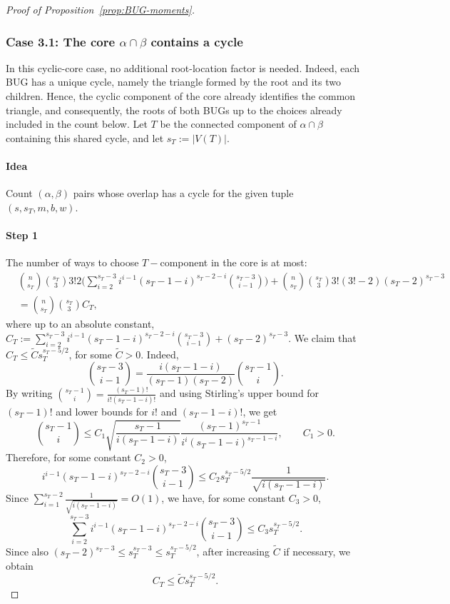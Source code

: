 \documentclass[11pt, letterpaper]{article}
\numberwithin{equation}{section}
\begin{document}
\begin{proof}[Proof of Proposition~\ref{prop:BUG-moments}]
\subsubsection*{Case 3.1: The core $\alpha \cap \beta$ contains a cycle} In this cyclic-core case, no additional root-location factor is needed. Indeed, each BUG has a unique cycle, namely the triangle formed by the root and its two
children. Hence, the cyclic component of the core already identifies the common triangle, and consequently, the roots of both BUGs up to the choices already included in the count below. Let $T$ be the connected component of $\alpha\cap\beta$ containing this shared cycle, and let $s_T:=|V(T)|.$

\paragraph*{Idea} Count $(\alpha,\beta)$ pairs whose overlap has a cycle for the given tuple $(s,s_T,m,b,w)$.

\paragraph*{Step 1}  The number of ways to choose $T-$component in the core is at most:
{\small \begin{align*}
    &\binom{n}{s_T}\binom{s_T}{3} 3! 2\bigg(\sum_{i=2}^{s_T-3} i^{i-1} (s_T-1-i)^{s_T-2-i} \binom{s_T -3}{i-1}\bigg)+\binom{n}{s_T}\binom{s_T}{3}3!(3!-2)(s_T-2)^{s_T-3}\\
    &=\binom{n}{s_T}\binom{s_T}{3}C_T,
\end{align*}}
where up to an absolute constant, $C_T:=\sum_{i=2}^{s_T-3} i^{i-1} (s_T-1-i)^{s_T-2-i} \binom{s_T -3}{i-1}
+(s_T-2)^{s_T-3}$. We claim that $C_T\leq \tilde C s_T^{s_T-5/2}$, for some $\tilde C>0$.
Indeed,
\[
\binom{s_T-3}{i-1}
=
\frac{i(s_T-1-i)}{(s_T-1)(s_T-2)}
\binom{s_T-1}{i}.
\]
By writing $\binom{s_T-1}{i}=\frac{(s_T-1)!}{i!(s_T-1-i)!}$ and using Stirling's upper bound for $(s_T-1)!$ and lower bounds for $i!$ and $(s_T-1-i)!$, we get
\[
\binom{s_T-1}{i} \le C_1\sqrt{\frac{s_T-1}{i(s_T-1-i)}}
\frac{(s_T-1)^{s_T-1}}{i^i(s_T-1-i)^{s_T-1-i}}, \qquad C_1>0.
\]
Therefore, for some constant $C_2>0$,
\[
i^{i-1}(s_T-1-i)^{s_T-2-i}\binom{s_T-3}{i-1}\le C_2 s_T^{s_T-5/2}\frac{1}{\sqrt{i(s_T-1-i)}}.
\]
Since $\sum_{i=1}^{s_T-2}\frac{1}{\sqrt{i(s_T-1-i)}}=O(1)$, we have, for some constant $C_3>0$,
\[
\sum_{i=2}^{s_T-3} i^{i-1}(s_T-1-i)^{s_T-2-i}\binom{s_T-3}{i-1}\le C_3 s_T^{s_T-5/2}. 
\]
Since also $(s_T-2)^{s_T-3}\le s_T^{s_T-3}\le s_T^{s_T-5/2}$, after increasing $\tilde C$ if necessary, we obtain
\[
C_T\le \tilde C s_T^{s_T-5/2}.
\]


\end{proof}
\end{document}
